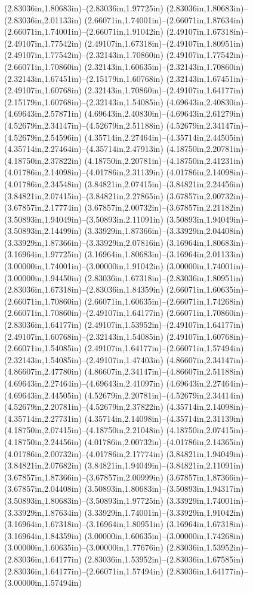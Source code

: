 (2.83036in,1.80683in)--(2.83036in,1.97725in) (2.83036in,1.80683in)--(2.83036in,2.01133in) (2.66071in,1.74001in)--(2.66071in,1.87634in) (2.66071in,1.74001in)--(2.66071in,1.91042in) (2.49107in,1.67318in)--(2.49107in,1.77542in) (2.49107in,1.67318in)--(2.49107in,1.80951in) (2.49107in,1.77542in)--(2.32143in,1.70860in) (2.49107in,1.77542in)--(2.66071in,1.70860in) (2.32143in,1.60635in)--(2.32143in,1.70860in) (2.32143in,1.67451in)--(2.15179in,1.60768in) (2.32143in,1.67451in)--(2.49107in,1.60768in) (2.32143in,1.70860in)--(2.49107in,1.64177in) (2.15179in,1.60768in)--(2.32143in,1.54085in) (4.69643in,2.40830in)--(4.69643in,2.57871in) (4.69643in,2.40830in)--(4.69643in,2.61279in) (4.52679in,2.34147in)--(4.52679in,2.51188in) (4.52679in,2.34147in)--(4.52679in,2.54596in) (4.35714in,2.27464in)--(4.35714in,2.44505in) (4.35714in,2.27464in)--(4.35714in,2.47913in) (4.18750in,2.20781in)--(4.18750in,2.37822in) (4.18750in,2.20781in)--(4.18750in,2.41231in) (4.01786in,2.14098in)--(4.01786in,2.31139in) (4.01786in,2.14098in)--(4.01786in,2.34548in) (3.84821in,2.07415in)--(3.84821in,2.24456in) (3.84821in,2.07415in)--(3.84821in,2.27865in) (3.67857in,2.00732in)--(3.67857in,2.17774in) (3.67857in,2.00732in)--(3.67857in,2.21182in) (3.50893in,1.94049in)--(3.50893in,2.11091in) (3.50893in,1.94049in)--(3.50893in,2.14499in) (3.33929in,1.87366in)--(3.33929in,2.04408in) (3.33929in,1.87366in)--(3.33929in,2.07816in) (3.16964in,1.80683in)--(3.16964in,1.97725in) (3.16964in,1.80683in)--(3.16964in,2.01133in) (3.00000in,1.74001in)--(3.00000in,1.91042in) (3.00000in,1.74001in)--(3.00000in,1.94450in) (2.83036in,1.67318in)--(2.83036in,1.80951in) (2.83036in,1.67318in)--(2.83036in,1.84359in) (2.66071in,1.60635in)--(2.66071in,1.70860in) (2.66071in,1.60635in)--(2.66071in,1.74268in) (2.66071in,1.70860in)--(2.49107in,1.64177in) (2.66071in,1.70860in)--(2.83036in,1.64177in) (2.49107in,1.53952in)--(2.49107in,1.64177in) (2.49107in,1.60768in)--(2.32143in,1.54085in) (2.49107in,1.60768in)--(2.66071in,1.54085in) (2.49107in,1.64177in)--(2.66071in,1.57494in) (2.32143in,1.54085in)--(2.49107in,1.47403in) (4.86607in,2.34147in)--(4.86607in,2.47780in) (4.86607in,2.34147in)--(4.86607in,2.51188in) (4.69643in,2.27464in)--(4.69643in,2.41097in) (4.69643in,2.27464in)--(4.69643in,2.44505in) (4.52679in,2.20781in)--(4.52679in,2.34414in) (4.52679in,2.20781in)--(4.52679in,2.37822in) (4.35714in,2.14098in)--(4.35714in,2.27731in) (4.35714in,2.14098in)--(4.35714in,2.31139in) (4.18750in,2.07415in)--(4.18750in,2.21048in) (4.18750in,2.07415in)--(4.18750in,2.24456in) (4.01786in,2.00732in)--(4.01786in,2.14365in) (4.01786in,2.00732in)--(4.01786in,2.17774in) (3.84821in,1.94049in)--(3.84821in,2.07682in) (3.84821in,1.94049in)--(3.84821in,2.11091in) (3.67857in,1.87366in)--(3.67857in,2.00999in) (3.67857in,1.87366in)--(3.67857in,2.04408in) (3.50893in,1.80683in)--(3.50893in,1.94317in) (3.50893in,1.80683in)--(3.50893in,1.97725in) (3.33929in,1.74001in)--(3.33929in,1.87634in) (3.33929in,1.74001in)--(3.33929in,1.91042in) (3.16964in,1.67318in)--(3.16964in,1.80951in) (3.16964in,1.67318in)--(3.16964in,1.84359in) (3.00000in,1.60635in)--(3.00000in,1.74268in) (3.00000in,1.60635in)--(3.00000in,1.77676in) (2.83036in,1.53952in)--(2.83036in,1.64177in) (2.83036in,1.53952in)--(2.83036in,1.67585in) (2.83036in,1.64177in)--(2.66071in,1.57494in) (2.83036in,1.64177in)--(3.00000in,1.57494in) 